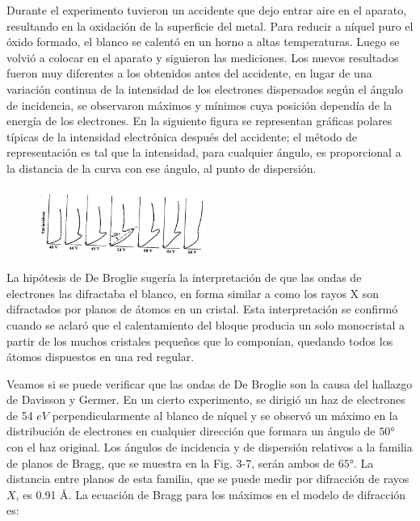 \documentclass[a4paper]{article}
\begin{document}
    \indent Durante el experimento tuvieron un accidente que dejo entrar aire en el aparato, resultando en la oxidación de la superficie del metal. Para reducir a níquel puro el óxido formado, el blanco se calentó en un horno a altas temperaturas. Luego se volvió a colocar en el aparato y siguieron las mediciones. Los nuevos resultados fueron muy diferentes a los obtenidos antes del accidente, en lugar de una variación continua de la intensidad de los electrones dispersados según el ángulo de incidencia, se observaron máximos y mínimos cuya posición dependía de la energía de los electrones. En la siguiente figura se representan gráficas polares típicas de la intensidad electrónica después del accidente; el método de representación es tal que la intensidad, para cualquier ángulo, es proporcional a la distancia de la curva con ese ángulo, al punto de dispersión.

    \begin{figure}[h!]
        \centering
        \includegraphics[width = 5.5cm]{../grafica.png}
    \end{figure}

    \indent La hipótesis de De Broglie sugería la interpretación de que las ondas de electrones las difractaba el blanco, en forma similar a como los rayos X son difractados por planos de átomos en un cristal. Esta interpretación se confirmó cuando se aclaró que el calentamiento del bloque producia un solo monocristal a partir de los muchos cristales pequeños que lo componían, quedando todos los átomos dispuestos en una red regular.

    \indent Veamos si se puede verificar que las ondas de De Broglie son la causa del hallazgo de Davisson y Germer. En un cierto experimento, se dirigió un haz de electrones de 54 $eV$ perpendicularmente al blanco de níquel y se observó un máximo en la distribución de electrones en cualquier dirección que formara un ángulo de $50°$ con el haz original. Los ángulos de incidencia y de dispersión relativos a la familia de planos de Bragg, que se muestra en la Fig. 3-7, serán ambos de $65°$. La distancia entre planos de esta familia, que se puede medir por difracción de rayos $X$, es 0.91 \AA. La ecuación de Bragg para los máximos en el modelo de difracción es:
\end{document}
